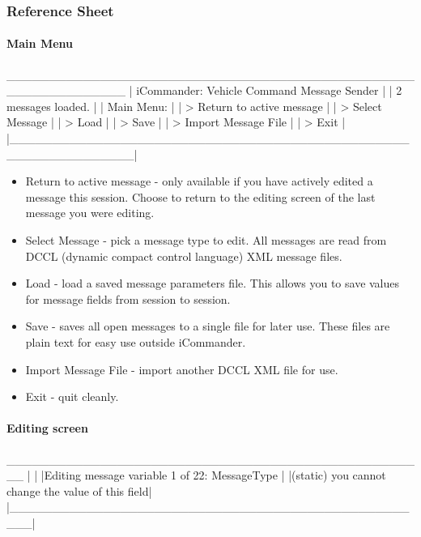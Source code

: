 \documentclass[11pt, letterpaper, oneside]{memoir}
\begin{document}
\begin{itemize}
\subsubsection{Reference Sheet}
\paragraph{Main Menu}
\begin{boxedverbatim}
 ______________________________________________________________
|            iCommander: Vehicle Command Message Sender        |
|                        2 messages loaded.                    |
|    Main Menu:                                                |
|    > Return to active message                                |
|    > Select Message                                          |
|    > Load                                                    |
|    > Save                                                    |
|    > Import Message File                                     |
|    > Exit                                                    |
|______________________________________________________________|
\end{boxedverbatim}
\resetbvlinenumber
\begin{itemize}
\item Return to active message - only available if you have actively edited a message this session. Choose to return to the editing screen of the last message you were editing.
\item Select Message - pick a message type to edit. All messages are read from DCCL (dynamic compact control language) XML message files.
\item Load - load a saved message parameters file. This allows you to save values for message fields from session to session.
\item Save - saves all open messages to a single file for later use. These files are plain text for easy use outside iCommander.
\item Import Message File - import another DCCL XML file for use.
\item Exit - quit cleanly.
\end{itemize}


\paragraph{Editing screen}
\begin{boxedverbatim}

    __________________________________________________
   |                                                  |
   |Editing message variable 1 of 22: MessageType     |
   |(static) you cannot change the value of this field|
   |__________________________________________________|


\end{boxedverbatim}
\end{itemize}
\end{document}
